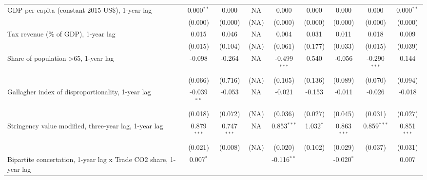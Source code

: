 \begin{table}[htbp]
\begin{tabular}{lcccccccc}
      GDP per capita (constant 2015 US\$), 1-year lag                  & 0.000$^{**}$  & 0.000                     & NA           & 0.000          & 0.000            & 0.000           & 0.000           & 0.000$^{**}$\\   
                                                                       & (0.000)       & (0.000)                   & (NA)         & (0.000)        & (0.000)          & (0.000)         & (0.000)         & (0.000)\\   
      Tax revenue (\% of GDP), 1-year lag                              & 0.015         & 0.046                     & NA           & 0.004          & 0.031            & 0.011           & 0.018           & 0.009\\   
                                                                       & (0.015)       & (0.104)                   & (NA)         & (0.061)        & (0.177)          & (0.033)         & (0.015)         & (0.039)\\   
      Share of population >65, 1-year lag                              & -0.098        & -0.264                    & NA           & -0.499$^{***}$ & 0.540            & -0.056          & -0.290$^{***}$  & 0.144\\   
                                                                       & (0.066)       & (0.716)                   & (NA)         & (0.105)        & (0.136)          & (0.089)         & (0.070)         & (0.094)\\   
      Gallagher index of disproportionality, 1-year lag                & -0.039$^{**}$ & -0.053                    & NA           & -0.021         & -0.153           & -0.011          & -0.026          & -0.018\\   
                                                                       & (0.018)       & (0.072)                   & (NA)         & (0.036)        & (0.027)          & (0.045)         & (0.031)         & (0.027)\\   
      Stringency value modified, three-year lag, 1-year lag            & 0.879$^{***}$ & 0.747$^{***}$             & NA           & 0.853$^{***}$  & 1.032$^{*}$      & 0.863$^{***}$   & 0.859$^{***}$   & 0.851$^{***}$\\   
                                                                       & (0.021)       & (0.008)                   & (NA)         & (0.020)        & (0.102)          & (0.029)         & (0.037)         & (0.031)\\   
      Bipartite concertation, 1-year lag x Trade CO2 share, 1-year lag & 0.007$^{*}$   &                           &              & -0.116$^{**}$  &                  & -0.020$^{*}$    &                 & 0.007\\   

\end{tabular}
\end{table}
